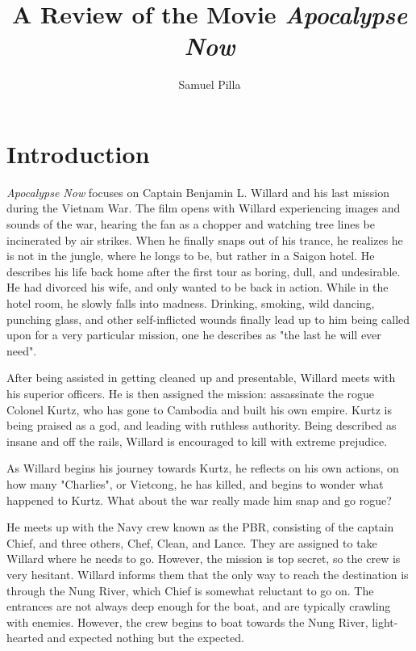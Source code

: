 \documentclass[a4paper,man,natbib]{apa6}
\title{A Review of the Movie \textit{Apocalypse Now}}
\author{Samuel Pilla}
\affiliation{Missouri University of Science and Technology}
\begin{document}
\maketitle

\section{Introduction}

\textit{Apocalypse Now} focuses on Captain Benjamin L. Willard and his last mission during the Vietnam War. The film opens with Willard experiencing images and sounds of the war, hearing the fan as a chopper and watching tree lines be incinerated by air strikes. When he finally snaps out of his trance, he realizes he is not in the jungle, where he longs to be, but rather in a Saigon hotel. He describes his life back home after the first tour as boring, dull, and undesirable. He had divorced his wife, and only wanted to be back in action. While in the hotel room, he slowly falls into madness. Drinking, smoking, wild dancing, punching glass, and other self-inflicted wounds finally lead up to him being called upon for a very particular mission, one he describes as "the last he will ever need".

After being assisted in getting cleaned up and presentable, Willard meets with his superior officers. He is then assigned the mission: assassinate the rogue Colonel Kurtz, who has gone to Cambodia and built his own empire. Kurtz is being praised as a god, and leading with ruthless authority. Being described as insane and off the rails, Willard is encouraged to kill with extreme prejudice.

As Willard begins his journey towards Kurtz, he reflects on his own actions, on how many "Charlies", or Vietcong, he has killed, and begins to wonder what happened to Kurtz. What about the war really made him snap and go rogue?

He meets up with the Navy crew known as the PBR, consisting of the captain Chief, and three others, Chef, Clean, and Lance. They are assigned to take Willard where he needs to go. However, the mission is top secret, so the crew is very hesitant. Willard informs them that the only way to reach the destination is through the Nung River, which Chief is somewhat reluctant to go on. The entrances are not always deep enough for the boat, and are typically crawling with enemies. However, the crew begins to boat towards the Nung River, light-hearted and expected nothing but the expected.
\end{document}
